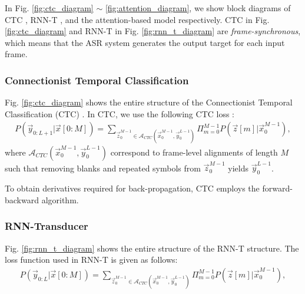\documentclass{article}
\begin{document}
 In Fig. 
\ref{fig:ctc_diagram} $\sim$ \ref{fig:attention_diagram}, we show
block diagrams of CTC \cite{a_graves_icml_2006_00}, 
RNN-T \cite{a_graves_corr_2012_00, a_graves_icassp_2013_00}, and 
the attention-based model 
\cite{
j_chorowski_nips_2015_00,
w_chan_icassp_2016_00} respectively. CTC in Fig. \ref{fig:ctc_diagram} 
and RNN-T in Fig. \ref{fig:rnn_t_diagram} are {\it frame-synchronous}, 
which means that the ASR system generates the output target for each 
input frame.


\subsubsection{Connectionist Temporal Classification}
\label{sec:ctc}

Fig. \ref{fig:ctc_diagram} shows the entire structure of the 
Connectionist Temporal Classification (CTC) 
\cite{a_graves_icml_2006_00}. In CTC, we use the following CTC loss
\cite{a_graves_icml_2006_00, y_he_icassp_2019_00}:
\begin{align}
  P\left(\vec{y}_{0:L+1} | \vec{x}[0:M]\right) = 
    \sum_{\vec{z}_{0}^{M-1} \in 
      \mathcal{A}_{CTC} 
        \left(\vec{x}_{0}^{M-1}, \vec{y}_{0}^{L-1} \right)}
          \Pi_{m=0}^{M-1}
            P\left(\vec{z}[m] | \vec{x}_{0}^{M-1} \right),
\end{align}
where $\mathcal{A}_{CTC} \left(\vec{x}_{0}^{M-1}, 
\vec{y}_{0}^{L-1} \right)$ correspond to frame-level alignments
of length $M$ such that removing blanks and repeated symbols from 
$\vec{z}_{0}^{M-1}$ yields $\vec{y}_{0}^{L-1}$.

To obtain derivatives required for back-propagation, CTC employs 
the forward-backward algorithm.



\subsubsection{RNN-Transducer}
\label{sec:rnn_t}

Fig. \ref{fig:rnn_t_diagram} shows the entire structure of the  
RNN-T structure. The loss function used in RNN-T is given as follows:
\begin{align}
  P\left(\vec{y}_{0:L} | \vec{x}[0:M]\right) = 
    \sum_{\vec{z}_{0}^{M-1} \in 
      \mathcal{A}_{CTC} 
        \left(\vec{x}_{0}^{M-1}, \vec{y}_{0}^{L-1} \right)}
          \Pi_{m=0}^{M-1}
            P\left(\vec{z}[m] | \vec{x}_{0}^{M-1} \right),
\end{align}
\end{document}
